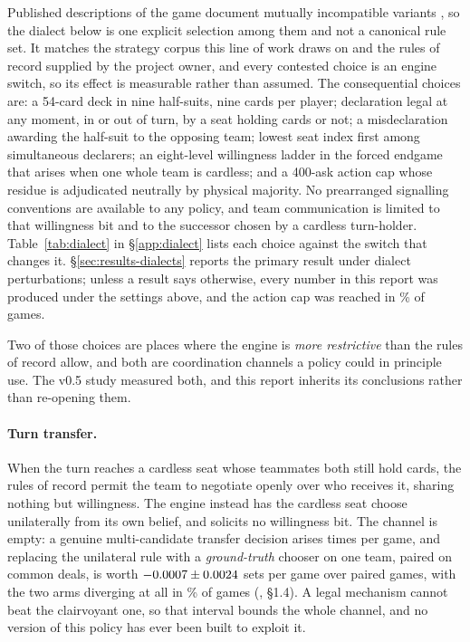 Published descriptions of the game document mutually incompatible variants
\cite{pagat}, so the dialect below is one explicit selection among them and not
a canonical rule set. It matches the strategy corpus this line of work draws on
\cite{develin} and the rules of record supplied by the project owner, and every
contested choice is an engine switch, so its effect is measurable rather than
assumed. The consequential choices are: a 54-card deck in nine half-suits, nine
cards per player; declaration legal at any moment, in or out of turn, by a seat
holding cards or not; a misdeclaration awarding the half-suit to the opposing
team; lowest seat index first among simultaneous declarers; an eight-level
willingness ladder in the forced endgame that arises when one whole team is
cardless; and a 400-ask action cap whose residue is adjudicated neutrally by
physical majority. No prearranged signalling conventions are available to any
policy, and team communication is limited to that willingness bit and to the
successor chosen by a cardless turn-holder. Table~\ref{tab:dialect} in
\S\ref{app:dialect} lists each choice against the switch that changes it.
\S\ref{sec:results-dialects} reports the primary result under
\vsixDialectN{} dialect perturbations; unless a result says otherwise, every
number in this report was produced under the settings above, and the action cap
was reached in \vsixLimitRate{}\% of games.

Two of those choices are places where the engine is \emph{more restrictive} than
the rules of record allow, and both are coordination channels a policy could in
principle use. The v0.5 study measured both, and this report inherits its
conclusions rather than re-opening them.

\paragraph{Turn transfer.} When the turn reaches a cardless seat whose teammates
both still hold cards, the rules of record permit the team to negotiate openly
over who receives it, sharing nothing but willingness. The engine instead has
the cardless seat choose unilaterally from its own belief, and solicits no
willingness bit. The channel is empty: a genuine multi-candidate transfer
decision arises \numTransferEvents{} times per game, and replacing the
unilateral rule with a \emph{ground-truth} chooser on one team, paired on common
deals, is worth $-0.0007 \pm 0.0024$ sets per game over
\numTransferGames{} paired games, with the two arms diverging at all in
\numTransferDiverged{}\% of games
(, \S1.4). A legal mechanism
cannot beat the clairvoyant one, so that interval bounds the whole channel, and
no version of this policy has ever been built to exploit it.


